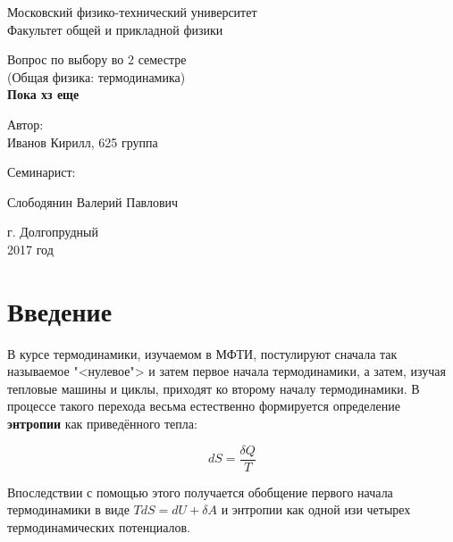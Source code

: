 \documentclass[12pt]{kiarticle}
\newcommand{\del}{\ensuremath{\delta}}
\begin{document}
\begin{titlepage}
	\begin{center}
		\large 	Московский физико-технический университет \\
		Факультет общей и прикладной физики \\
		\vspace{0.2cm}
		
		\vspace{4.5cm}
		Вопрос по выбору во 2 семестре \\ \vspace{0.2cm}
		\large (Общая физика: термодинамика) \\ \vspace{0.2cm}
		\LARGE \textbf{Пока хз еще}
	\end{center}
	\vspace{2.3cm} \large
	
	\begin{center}
		Автор: \\
		Иванов Кирилл,
		625 группа
		\vspace{10mm}
		
		Семинарист: 
		
		Слободянин Валерий Павлович
		
		
	\end{center}
	
	\begin{center} \vspace{50mm}
		г. Долгопрудный \\
		 2017 год
	\end{center}
\end{titlepage}


\section{Введение}

В курсе термодинамики, изучаемом в МФТИ, постулируют сначала так называемое "<нулевое"> и затем первое начала термодинамики, а затем, изучая тепловые машины и циклы, приходят ко второму началу термодинамики. В процессе такого перехода весьма естественно формируется определение \textbf{энтропии} как приведённого тепла: 

\begin{equation}\label{defent}
 dS = \dfrac{\del Q}{T}
\end{equation}

Впоследствии с помощью этого получается обобщение первого начала термодинамики в виде $ TdS = dU + \del A $ и энтропии как одной изи четырех термодинамических потенциалов. 
\end{document}

